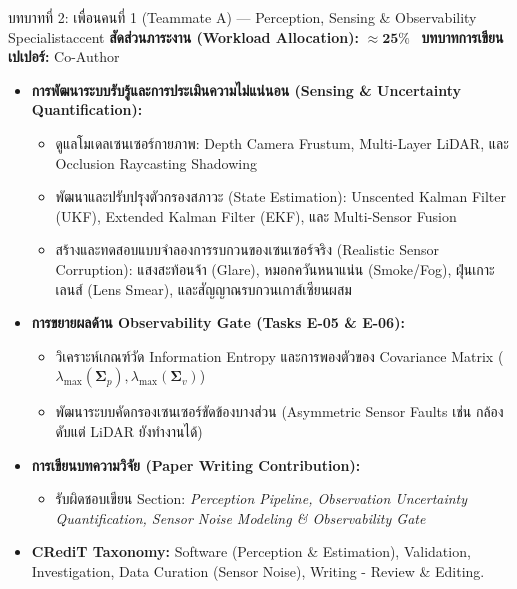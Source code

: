\documentclass[10pt,a4paper]{article}
\begin{document}
\vspace{4pt}

\begin{rolebox}{บทบาทที่ 2: เพื่อนคนที่ 1 (Teammate A) — Perception, Sensing \& Observability Specialist}{accent}
  \textbf{สัดส่วนภาระงาน (Workload Allocation):} $\approx \mathbf{25\%}$ \textbar\ \textbf{บทบาทการเขียนเปเปอร์:} Co-Author
  \begin{itemize}[leftmargin=12pt, itemsep=1pt, topsep=1pt, parsep=0pt]
    \item \textbf{การพัฒนาระบบรับรู้และการประเมินความไม่แน่นอน (Sensing \& Uncertainty Quantification):}
      \begin{itemize}[itemsep=0.5pt, parsep=0pt]
        \item ดูแลโมเดลเซนเซอร์กายภาพ: Depth Camera Frustum, Multi-Layer LiDAR, และ Occlusion Raycasting Shadowing
        \item พัฒนาและปรับปรุงตัวกรองสภาวะ (State Estimation): Unscented Kalman Filter (UKF), Extended Kalman Filter (EKF), และ Multi-Sensor Fusion
        \item สร้างและทดสอบแบบจำลองการรบกวนของเซนเซอร์จริง (Realistic Sensor Corruption): แสงสะท้อนจ้า (Glare), หมอกควันหนาแน่น (Smoke/Fog), ฝุ่นเกาะเลนส์ (Lens Smear), และสัญญาณรบกวนเกาส์เซียนผสม
      \end{itemize}
    \item \textbf{การขยายผลด้าน Observability Gate (Tasks E-05 \& E-06):}
      \begin{itemize}[itemsep=0.5pt, parsep=0pt]
        \item วิเคราะห์เกณฑ์วัด Information Entropy และการพองตัวของ Covariance Matrix ($\lambda_{\max}(\boldsymbol{\Sigma}_p), \lambda_{\max}(\boldsymbol{\Sigma}_v)$)
        \item พัฒนาระบบคัดกรองเซนเซอร์ขัดข้องบางส่วน (Asymmetric Sensor Faults เช่น กล้องดับแต่ LiDAR ยังทำงานได้)
      \end{itemize}
    \item \textbf{การเขียนบทความวิจัย (Paper Writing Contribution):}
      \begin{itemize}[itemsep=0.5pt, parsep=0pt]
        \item รับผิดชอบเขียน Section: \textit{Perception Pipeline, Observation Uncertainty Quantification, Sensor Noise Modeling \& Observability Gate}
      \end{itemize}
    \item \textbf{CRediT Taxonomy:} Software (Perception \& Estimation), Validation, Investigation, Data Curation (Sensor Noise), Writing - Review \& Editing.
  \end{itemize}
\end{rolebox}
\end{document}
